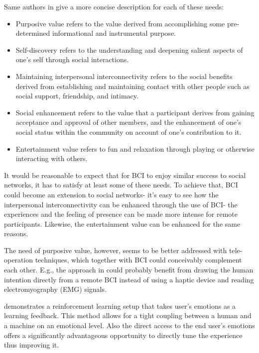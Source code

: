 \documentclass[fleqn,11pt]{olplainarticle}
\begin{document}
Same authors in \cite{cheung2011online} give a more concise description for each of these needs: 
\begin{displayquote}
    \begin{itemize}
        \item Purposive value refers to the value derived from accomplishing some pre-determined informational and instrumental purpose.
        \item Self-discovery refers to the understanding and deepening salient aspects of one’s self through social interactions.
        \item Maintaining interpersonal interconnectivity refers to the social benefits derived from establishing and maintaining contact with other people such as social support, friendship, and intimacy.
        \item Social enhancement refers to the value that a participant derives from gaining acceptance and approval of other members, and the enhancement of one’s social status within the community on account of one’s contribution to it.
        \item Entertainment value refers to fun and relaxation through playing or otherwise interacting with others.
    \end{itemize}
\end{displayquote}

It would be reasonable to expect that for BCI to enjoy similar success to social networks, it has to satisfy at least some of these needs. To achieve that, BCI could become an extension to social networks- it's easy to see how the interpersonal interconnectivity can be enhanced through the use of BCI- the experiences and the feeling of presence can be made more intense for remote participants. Likewise, the entertainment value can be enhanced for the same reasons. 

The need of purposive value, however, seems to be better addressed with tele-operation techniques, which together with BCI could conceivably complement each other. E.g., the approach in \cite{luo2019teleoperation} could probably benefit from drawing the human intention directly from a remote BCI instead of using a haptic device and reading electromyography (EMG) signals.

\cite{shih2017deep} demonstrates a reinforcement learning setup that takes user's emotions as a learning feedback. This method allows for a tight coupling between a human and a machine on an emotional level. Also the direct access to the end user's emotions offers a significantly advantageous opportunity to directly tune the experience thus improving it.
\end{document}
